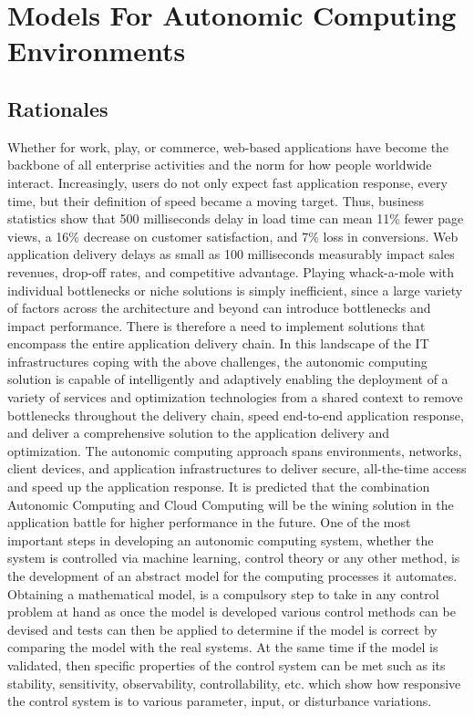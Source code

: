 \chapter{Models For Autonomic Computing Environments} %
\label{Chapter3}
\section{Rationales}
Whether for work, play, or commerce, web-based applications have become the backbone of all enterprise activities and the norm for how people worldwide interact. Increasingly, users do not only expect fast application response, every time, but their definition of speed became a moving target. Thus, business statistics show that 500 milliseconds delay in load time can mean 11\% fewer page views, a 16\% decrease on customer satisfaction, and 7\% loss in conversions.
Web application delivery delays as small as 100 milliseconds measurably impact sales revenues, drop-off rates, and competitive advantage. Playing whack-a-mole with individual bottlenecks or niche solutions is simply inefficient, since a large variety of factors across the architecture and beyond can introduce bottlenecks and impact performance. There is therefore a need to implement solutions that encompass the entire application delivery chain.
In this landscape of the IT infrastructures coping with the above challenges, the autonomic computing solution is capable of intelligently and adaptively enabling the deployment of a variety of services and optimization technologies from a shared context to remove bottlenecks throughout the delivery chain, speed end-to-end application response, and deliver a comprehensive solution to the application delivery and optimization.
The autonomic computing approach spans environments, networks, client devices, and application infrastructures to deliver secure, all-the-time access and speed up the application response. It is predicted that the combination Autonomic Computing and Cloud Computing will be the wining solution in the application battle for higher performance in the future.
One of the most important steps in developing an autonomic computing system, whether the system is controlled via machine learning, control theory or any other method, is the development of an abstract model for the computing processes it automates.
Obtaining a mathematical model, is a compulsory step to take in any control problem at hand as once the model is developed various control methods can be devised and tests can then be applied to determine if the model is correct by comparing the model with the real systems. At the same time if the model is validated, then specific properties of the control system can be met such as  its stability, sensitivity, observability, controllability, etc. which show how responsive the control system is to various parameter, input, or disturbance variations. 

